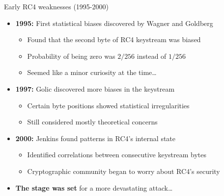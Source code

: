 \documentclass[aspectratio=169, lualatex, handout]{beamer}
\begin{document}
\begin{frame}{Early RC4 weaknesses (1995-2000)}
	\begin{itemize}
		\item \textbf{1995:} First statistical biases discovered by Wagner and Goldberg
		      \begin{itemize}
			      \item Found that the second byte of RC4 keystream was biased
			      \item Probability of being zero was $2/256$ instead of $1/256$
			      \item Seemed like a minor curiosity at the time\ldots
		      \end{itemize}
		\item \textbf{1997:} Golic discovered more biases in the keystream
		      \begin{itemize}
			      \item Certain byte positions showed statistical irregularities
			      \item Still considered mostly theoretical concerns
		      \end{itemize}
		\item \textbf{2000:} Jenkins found patterns in RC4's internal state
		      \begin{itemize}
			      \item Identified correlations between consecutive keystream bytes
			      \item Cryptographic community began to worry about RC4's security
		      \end{itemize}
		\item \textbf{The stage was set} for a more devastating attack\ldots
	\end{itemize}
\end{frame}
\end{document}
